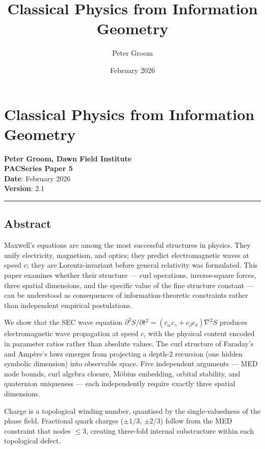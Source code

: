 \documentclass[
  11pt,
  a4paper]{article}
\title{Classical Physics from Information Geometry}
\author{Peter Groom}
\date{February 2026}
\begin{document}
\maketitle

\renewcommand*\contentsname{Contents}
{
\setcounter{tocdepth}{3}
\tableofcontents
}
\section{Classical Physics from Information
Geometry}\label{classical-physics-from-information-geometry}

\textbf{Peter Groom, Dawn Field Institute}\\
\textbf{PACSeries Paper 5}\\
\textbf{Date}: February 2026\\
\textbf{Version}: 2.1

\begin{center}\rule{0.5\linewidth}{0.5pt}\end{center}

\subsection{Abstract}\label{abstract}

Maxwell's equations are among the most successful structures in physics.
They unify electricity, magnetism, and optics; they predict
electromagnetic waves at speed \(c\); they are Lorentz-invariant before
general relativity was formulated. This paper examines whether their
structure --- curl operations, inverse-square forces, three spatial
dimensions, and the specific value of the fine structure constant ---
can be understood as consequences of information-theoretic constraints
rather than independent empirical postulations.

We show that the SEC wave equation
\(\partial^2 S/\partial t^2 = (c_\alpha c_\gamma + c_\beta c_\delta)\nabla^2 S\)
produces electromagnetic wave propagation at speed \(c\), with the
physical content encoded in parameter ratios rather than absolute
values. The curl structure of Faraday's and Ampère's laws emerges from
projecting a depth-2 recursion (one hidden symbolic dimension) into
observable space. Five independent arguments --- MED node bounds, curl
algebra closure, Möbius embedding, orbital stability, and quaternion
uniqueness --- each independently require exactly three spatial
dimensions.

Charge is a topological winding number, quantised by the
single-valuedness of the phase field. Fractional quark charges
(\(\pm 1/3\), \(\pm 2/3\)) follow from the MED constraint that nodes
\(\leq 3\), creating three-fold internal substructure within each
topological defect.
\end{document}
